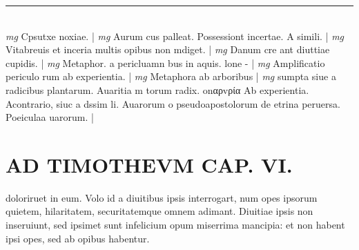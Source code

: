 \documentclass{article}
\begin{document}
\begin{pages}
\vspace{0.2cm}\rule{1cm}{0.2pt}\\ 
\hspace{0.2cm}\textit{mg}
\footnotesize Cpsutxe noxiae. 
\normalsize| 
\hspace{0.2cm}\textit{mg}
\footnotesize Aurum cus palleat. Possessiont incertae. A simili. 
\normalsize| 
\hspace{0.2cm}\textit{mg}
\footnotesize Vitabreuis et inceria multis opibus non mdiget. 
\normalsize| 
\hspace{0.2cm}\textit{mg}
\footnotesize Danum cre ant diuttiae cupidis. 
\normalsize| 
\hspace{0.2cm}\textit{mg}
\footnotesize Metaphor. a pericluamn bus in aquis. lone - 
\normalsize| 
\hspace{0.2cm}\textit{mg}
\footnotesize Amplificatio periculo rum ab experientia. 
\normalsize| 
\hspace{0.2cm}\textit{mg}
\footnotesize Metaphora ab arboribus  
\normalsize| 
\hspace{0.2cm}\textit{mg}
\footnotesize sumpta siue a radicibus plantarum. Auaritia m torum radix. onαρvρία Ab experientia. Acontrario, siuc a dssim li. Auarorum o pseudoapostolorum de etrina peruersa. Poeiculaa uarorum. 
\normalsize| 
\section*{AD TIMOTHEVM CAP. VI. }
\marginpar{[ p.127 ]}\pstart doloriruet in eum. Volo id a diuitibus ipsis interrogart, num opes ipsorum quietem, hilaritatem, securitatemque omnem adimant. Diuitiae ipsis non inseruiunt, sed ipsimet sunt infelicium opum miserrima mancipia: et non habent ipsi opes, sed ab opibus habentur.  \pend
{}
{}

\end{pages}
\end{document}
